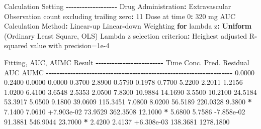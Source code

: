 \documentclass[
  10pt,
]{krantz}
\makeatletter
\newenvironment{Shaded}{\begin{snugshade}}{\end{snugshade}}
\newcommand{\ControlFlowTok}[1]{\textcolor[rgb]{0.13,0.29,0.53}{\textbf{#1}}}
\newcommand{\DecValTok}[1]{\textcolor[rgb]{0.00,0.00,0.81}{#1}}
\newcommand{\FloatTok}[1]{\textcolor[rgb]{0.00,0.00,0.81}{#1}}
\newcommand{\KeywordTok}[1]{\textcolor[rgb]{0.13,0.29,0.53}{\textbf{#1}}}
\newcommand{\NormalTok}[1]{#1}
\newcommand{\OperatorTok}[1]{\textcolor[rgb]{0.81,0.36,0.00}{\textbf{#1}}}
\newcommand{\StringTok}[1]{\textcolor[rgb]{0.31,0.60,0.02}{#1}}
\newenvironment{kframe}{%
\medskip{}
\setlength{\fboxsep}{.8em}
 \def\at@end@of@kframe{}%
 \ifinner\ifhmode%
  \def\at@end@of@kframe{\end{minipage}}%
  \begin{minipage}{\columnwidth}%
 \fi\fi%
 \def\FrameCommand##1{\hskip\@totalleftmargin \hskip-\fboxsep
 \colorbox{shadecolor}{##1}\hskip-\fboxsep
     \hskip-\linewidth \hskip-\@totalleftmargin \hskip\columnwidth}%
 \MakeFramed {\advance\hsize-\width
   \@totalleftmargin\z@ \linewidth\hsize
   \@setminipage}}%
 {\par\unskip\endMakeFramed%
 \at@end@of@kframe}
\renewenvironment{Shaded}{\begin{kframe}}{\end{kframe}}
\makeatother
\begin{document}
\begin{Shaded}
\begin{Highlighting}[]
\NormalTok{Calculation Setting}
\OperatorTok{{-}{-}{-}{-}{-}{-}{-}{-}{-}{-}{-}{-}{-}{-}{-}{-}{-}{-}{-}}
\NormalTok{Drug Administration}\OperatorTok{:}\StringTok{ }\NormalTok{Extravascular}
\NormalTok{Observation count excluding trailing zero}\OperatorTok{:}\StringTok{ }\DecValTok{11}
\NormalTok{Dose at time }\DecValTok{0}\OperatorTok{:}\StringTok{ }\DecValTok{320}\NormalTok{ mg}
\NormalTok{AUC Calculation Method}\OperatorTok{:}\StringTok{ }\NormalTok{Linear}\OperatorTok{{-}}\NormalTok{up Linear}\OperatorTok{{-}}\NormalTok{down}
\NormalTok{Weighting }\ControlFlowTok{for}\NormalTok{ lambda z}\OperatorTok{:}\StringTok{ }\KeywordTok{Uniform}\NormalTok{ (Ordinary Least Square, OLS)}
\NormalTok{Lambda z selection criterion}\OperatorTok{:}\StringTok{ }\NormalTok{Heighest adjusted R}\OperatorTok{{-}}\NormalTok{squared value with precision=}\FloatTok{1e{-}4}


\NormalTok{Fitting, AUC, AUMC Result}
\OperatorTok{{-}{-}{-}{-}{-}{-}{-}{-}{-}{-}{-}{-}{-}{-}{-}{-}{-}{-}{-}{-}{-}{-}{-}{-}{-}}
\StringTok{      }\NormalTok{Time         Conc.      Pred.   Residual       AUC       AUMC}
\OperatorTok{{-}{-}{-}{-}{-}{-}{-}{-}{-}{-}{-}{-}{-}{-}{-}{-}{-}{-}{-}{-}{-}{-}{-}{-}{-}{-}{-}{-}{-}{-}{-}{-}{-}{-}{-}{-}{-}{-}{-}{-}{-}{-}{-}{-}{-}{-}{-}{-}{-}{-}{-}{-}{-}{-}{-}{-}{-}{-}{-}{-}{-}{-}{-}{-}{-}{-}{-}{-}{-}}
\StringTok{     }\FloatTok{0.0000}       \FloatTok{0.2400}                           \FloatTok{0.0000}     \FloatTok{0.0000}
     \FloatTok{0.3700}       \FloatTok{2.8900}                           \FloatTok{0.5790}     \FloatTok{0.1978}
     \FloatTok{0.7700}       \FloatTok{5.2200}                           \FloatTok{2.2011}     \FloatTok{1.2156}
     \FloatTok{1.0200}       \FloatTok{6.4100}                           \FloatTok{3.6548}     \FloatTok{2.5353}
     \FloatTok{2.0500}       \FloatTok{7.8300}                          \FloatTok{10.9884}    \FloatTok{14.1690}
     \FloatTok{3.5500}      \FloatTok{10.2100}                          \FloatTok{24.5184}    \FloatTok{53.3917}
     \FloatTok{5.0500}       \FloatTok{9.1800}                          \FloatTok{39.0609}   \FloatTok{115.3451}
     \FloatTok{7.0800}       \FloatTok{8.0200}                          \FloatTok{56.5189}   \FloatTok{220.0328}
     \FloatTok{9.3800} \OperatorTok{*}\StringTok{     }\FloatTok{7.1400}     \FloatTok{7.0610} \FloatTok{+7.903e{-}02}    \FloatTok{73.9529}   \FloatTok{362.3508}
    \FloatTok{12.1000} \OperatorTok{*}\StringTok{     }\FloatTok{5.6800}     \FloatTok{5.7586} \FloatTok{{-}7.858e{-}02}    \FloatTok{91.3881}   \FloatTok{546.9044}
    \FloatTok{23.7000} \OperatorTok{*}\StringTok{     }\FloatTok{2.4200}     \FloatTok{2.4137} \FloatTok{+6.308e{-}03}   \FloatTok{138.3681}  \FloatTok{1278.1800}


\end{Highlighting}
\end{Shaded}
\end{document}
